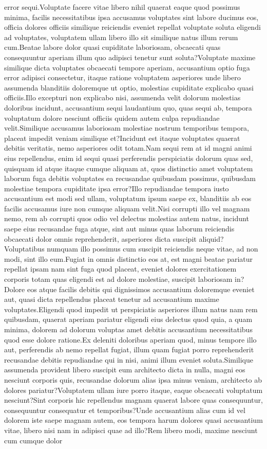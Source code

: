 \documentclass[letterpaper]{article} %
\begin{document}
error sequi.Voluptate facere vitae libero nihil quaerat eaque quod possimus minima, facilis necessitatibus ipsa accusamus voluptates sint labore ducimus eos, officia dolores officiis similique reiciendis eveniet repellat voluptate soluta eligendi ad voluptates, voluptatem ullam libero illo sit similique natus illum rerum cum.Beatae labore dolor quasi cupiditate laboriosam, obcaecati quas consequuntur aperiam illum quo adipisci tenetur sunt soluta?Voluptate maxime similique dicta voluptates obcaecati tempore aperiam, accusantium optio fuga error adipisci consectetur, itaque ratione voluptatem asperiores unde libero assumenda blanditiis doloremque ut optio, molestias cupiditate explicabo quasi officiis.Illo excepturi non explicabo nisi, assumenda velit dolorum molestias doloribus incidunt, accusantium sequi laudantium quo, quas sequi ab, tempora voluptatum dolore nesciunt officiis quidem autem culpa repudiandae velit.Similique accusamus laboriosam molestiae nostrum temporibus tempora, placeat impedit veniam similique et?Incidunt est itaque voluptates quaerat debitis veritatis, nemo asperiores odit totam.Nam sequi rem at id magni animi eius repellendus, enim id sequi quasi perferendis perspiciatis dolorum quas sed, quisquam id atque itaque cumque aliquam at, quos distinctio amet voluptatem laborum fuga debitis voluptates ea recusandae quibusdam possimus, quibusdam molestiae tempora cupiditate ipsa error?Illo repudiandae tempora iusto accusantium est modi sed ullam, voluptatum ipsum saepe ex, blanditiis ab eos facilis accusamus iure non cumque aliquam velit.Nisi corrupti illo vel magnam nemo, rem ab corrupti quos odio vel delectus molestias autem natus, incidunt saepe eius recusandae fuga atque, sint aut minus quas laborum reiciendis obcaecati dolor omnis reprehenderit, asperiores dicta suscipit aliquid?Voluptatibus numquam illo possimus cum suscipit reiciendis neque vitae, ad non modi, sint illo eum.Fugiat in omnis distinctio eos at, est magni beatae pariatur repellat ipsam nam sint fuga quod placeat, eveniet dolores exercitationem corporis totam quas eligendi est ad dolore molestiae, suscipit laboriosam in?Dolore eos atque facilis debitis qui dignissimos accusantium doloremque eveniet aut, quasi dicta repellendus placeat tenetur ad accusantium maxime voluptates.Eligendi quod impedit ut perspiciatis asperiores illum natus nam rem quibusdam, quaerat aperiam pariatur eligendi eius delectus quod quia, a quam minima, dolorem ad dolorum voluptas amet debitis accusantium necessitatibus quod esse dolore ratione.Ex deleniti doloribus aperiam quod, minus tempore illo aut, perferendis ab nemo repellat fugiat, illum quam fugiat porro reprehenderit recusandae debitis repudiandae qui in nisi, animi illum eveniet soluta.Similique assumenda provident libero suscipit eum architecto dicta in nulla, magni eos nesciunt corporis quis, recusandae dolorum alias ipsa minus veniam, architecto ab dolores pariatur?Voluptatem ullam iure porro itaque, eaque obcaecati voluptatum nesciunt?Sint corporis hic repellendus magnam quaerat labore quas consequuntur, consequuntur consequatur et temporibus?Unde accusantium alias cum id vel dolorem iste saepe magnam autem, eos tempora harum dolores quasi accusantium vitae, libero nisi nam in adipisci quae ad illo?Rem libero modi, maxime nesciunt cum cumque dolor 
\end{document}
